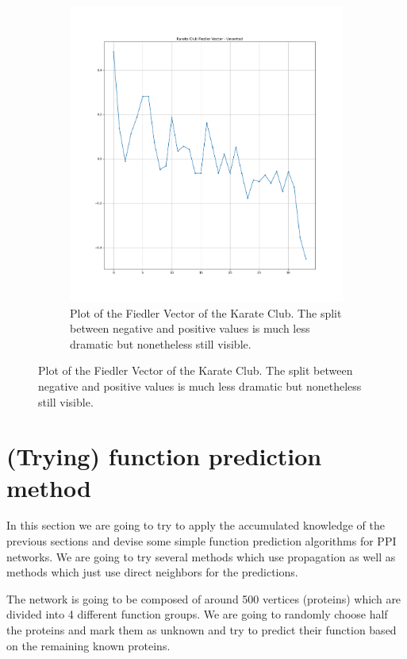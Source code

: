 \documentclass[a4paper,10pt]{article}
\theoremstyle{definition}
\theoremstyle{remark}
\theoremstyle{plain}
\begin{document}
\begin{figure}
\begin{subfigure}[b]{0.5\textwidth}
\includegraphics[width=\textwidth]{karate_fiedler_unsorted.png}
\caption{Plot of the Fiedler Vector of the Karate Club. The split between
negative and positive values is much less dramatic but nonetheless still visible.}
\label{fig:karatefiedlerplot}
\end{subfigure}
\end{figure}

\section{(Trying) function prediction method}
In this section we are going to try to apply the accumulated knowledge of the
previous sections and devise some simple function prediction algorithms for PPI
networks. We are going to try several methods which use propagation as well as
methods which just use direct neighbors for the predictions.

The network is going to be composed of around 500 vertices (proteins) which are
divided into 4 different function groups. We are going to randomly choose half
the proteins and mark them as unknown and try to predict their function based
on the remaining known proteins. 
\end{document}
